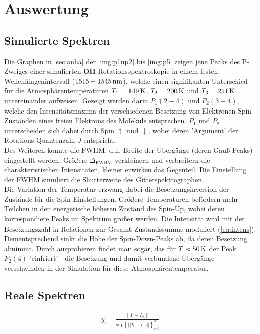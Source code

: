 \documentclass[numbers=noenddot,a4paper,notitlepage,twoside,BCOR15mm]{scrartcl}
\newcommand{\ix}[1]{_\text{#1}}
\newcommand{\fett}[1]{\textbf{#1}}
\begin{document}
	\clearpage
	\section{Auswertung}

		\subsection{Simulierte Spektren}

			Die Graphen in \autoref{sec:anha} der \autoref{img:p1up2} bis \autoref{img:p5} zeigen jene Peaks des P-Zweiges einer simulierten \fett{OH}-Rotationsspektroskopie in einem festen Wellenlängenintervall ($\unit[1515-1545]{nm}$), welche einen signifikanten Unterschied für die Atmosphärentemperaturen $T_1=\unit[149]{K}$, $T_2=\unit[200]{K}$ und $T_3=\unit[251]{K}$ untereinander aufweisen. Gezeigt werden darin $P\ix{1}(2-4)$ und $P\ix{2}(3-4)$, welche den Intensitätsmaxima der verschiedenen Besetzung von Elektronen-Spin-Zuständen eines freien Elektrons des Moleküls entsprechen. $P\ix{1}$ und $P\ix{2}$ unterscheiden sich dabei durch Spin $\uparrow$ und $\downarrow$, wobei deren 'Argument' der Rotations-Quantenzahl $J$ entspricht.\\
			Des Weiteren konnte die FWHM, d.h. Breite der Übergänge (deren Gauß-Peaks) eingestellt werden. Größere $\Delta\ix{FWHM}$ verkleinern und verbreitern die charakteristischen Intensitäten, kleiner erwirken das Gegenteil. Die Einstellung der FWHM simuliert die Shutterweite des Gitterspektrographen.\\
			Die Variation der Temperatur erzwang dabei die Besetzungsinversion der Zustände für die Spin-Einstellungen. Größere Temperaturen befördern mehr Teilchen in den energetische höheren Zustand des Spin-Up, wobei deren korrespondiere Peaks im Spektrum größer werden. Die Intensität wird mit der Besetzungszahl in Relationen zur Gesamt-Zustandssumme moduliert (\autoref{eq:intens}). Dementsprechend sinkt die Höhe der Spin-Down-Peaks ab, da deren Besetzung abnimmt. Durch ausprobieren findet man sogar, das für $T\approx\unit[50]{K}$ der Peak $P\ix{2}(4)$ 'einfriert' - die Besetzung und damit verbundene Übergänge verschwinden in der Simulation für diese Atmosphärentemperatur.

		\subsection{Reale Spektren}

				\begin{align}
					y\ix{i}=\frac{||I\ix{i}-I\ix{0,i}||}{\text{sup}\left\lbrace ||I\ix{i}-I\ix{0,i}||\right\rbrace\ix{i=0}^{N}} \label{eq:norm}
				\end{align}
\end{document}
